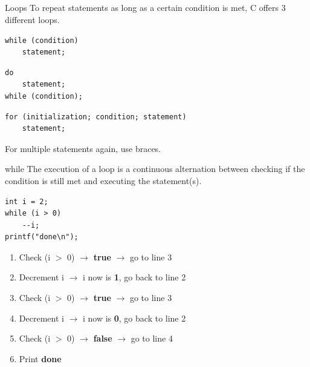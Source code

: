 \subsection{}
\begin{frame}[fragile]{Loops}
	To repeat statements as long as a certain condition is met, C offers 3 different loops.
	\begin{lstlisting}[numbers=none,basicstyle=\itshape\footnotesize]
while (condition)
	statement;
\end{lstlisting}
	\begin{lstlisting}[numbers=none,basicstyle=\itshape\footnotesize]
do
	statement;
while (condition);
\end{lstlisting}
	\begin{lstlisting}[numbers=none,basicstyle=\itshape\footnotesize]
for (initialization; condition; statement)
	statement;
\end{lstlisting}
	For multiple statements again, use braces.
\end{frame}
\begin{frame}[fragile]{while}
	The execution of a loop is a continuous alternation between checking if the condition is still met and executing the statement(s).
	\begin{lstlisting}
int i = 2;
while (i > 0)
	--i;
printf("done\n");
\end{lstlisting}
	\begin{enumerate}[<+(1)->]
		\item Check (i $>$ 0) $\rightarrow$ \textbf{true} $\rightarrow$ go to line 3
		\item Decrement i $\rightarrow$ i now is \textbf{1}, go back to line 2
		\item Check (i $>$ 0) $\rightarrow$ \textbf{true} $\rightarrow$ go to line 3
		\item Decrement i $\rightarrow$ i now is \textbf{0}, go back to line 2
		\item Check (i $>$ 0) $\rightarrow$ \textbf{false} $\rightarrow$ go to line 4
		\item Print \textbf{done}
	\end{enumerate}
\end{frame}

